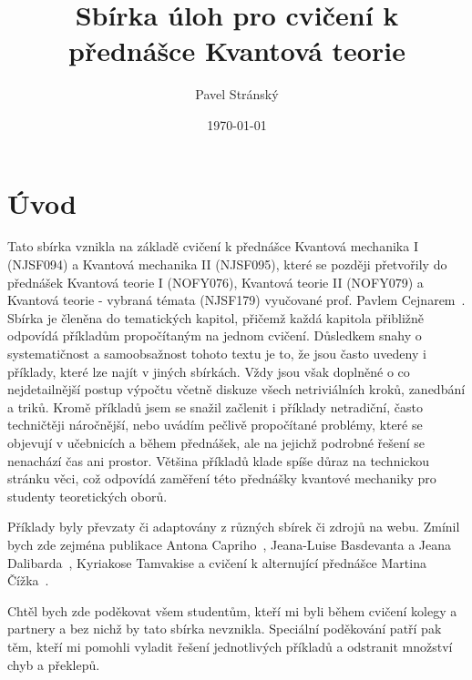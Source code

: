 \documentclass[a4paper,11pt,twoside]{article}
\def\secpage{1}
\begin{document}
\makeatletter
{}
\renewcommand{\theequation}{\arabic{section}.\arabic{subsection}.\arabic{equation}}

\ifthenelse{\equal{\secpage}{1}}
	{\renewcommand{\thepage}{\arabic{section}.\arabic{page}}}
	{}
\makeatother

\title{Sbírka úloh pro cvičení k přednášce Kvantová teorie}
\date{\today}
\author{Pavel Stránský}

\maketitle
{}
\tableofcontents\np

\section*{Úvod}
Tato sbírka vznikla na základě cvičení k přednášce Kvantová mechanika I (NJSF094) a Kvantová mechanika II (NJSF095), které se později přetvořily do přednášek Kvantová teorie I (NOFY076), Kvantová teorie II (NOFY079) a Kvantová teorie - vybraná témata (NJSF179) vyučované prof. Pavlem Cejnarem~\cite{Cejnar}.
Sbírka je členěna do tematických kapitol, přičemž každá kapitola přibližně odpovídá příkladům propočítaným na jednom cvičení.
Důsledkem snahy o systematičnost a samoobsažnost tohoto textu je to, že jsou často uvedeny i příklady, které lze najít v jiných sbírkách.
Vždy jsou však doplněné o co nejdetailnější postup výpočtu včetně diskuze všech netriviálních kroků, zanedbání a triků.
Kromě příkladů  jsem se snažil začlenit i příklady netradiční, často techničtěji náročnější, nebo uvádím pečlivě propočítané problémy, které se objevují v učebnicích a během přednášek, ale na jejichž podrobné řešení se nenachází čas ani prostor.
Většina příkladů klade spíše důraz na technickou stránku věci, což odpovídá zaměření této přednášky kvantové mechaniky pro studenty teoretických oborů.

Příklady byly převzaty či adaptovány z různých sbírek či zdrojů na webu.
Zmínil bych zde zejména publikace Antona Capriho~\cite{Capri2002}, Jeana-Luise Basdevanta a Jeana Dalibarda~\cite{Basdevant2000}, Kyriakose Tamvakise\cite{Tamvakis2005} a cvičení k alternující přednášce Martina Čížka~\cite{CizekWWW1,CizekWWW2}.

Chtěl bych zde poděkovat všem studentům, kteří mi byli během cvičení kolegy a partnery a bez nichž by tato sbírka nevznikla.
Speciální poděkování patří pak těm, kteří mi pomohli vyladit řešení jednotlivých příkladů a odstranit množství chyb a překlepů.
\end{document}
